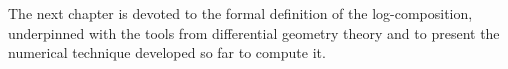 The next chapter is devoted to the formal definition of the log-composition, underpinned with the tools from differential geometry theory and to present the numerical technique developed so far to compute it.







%
%
%
%
